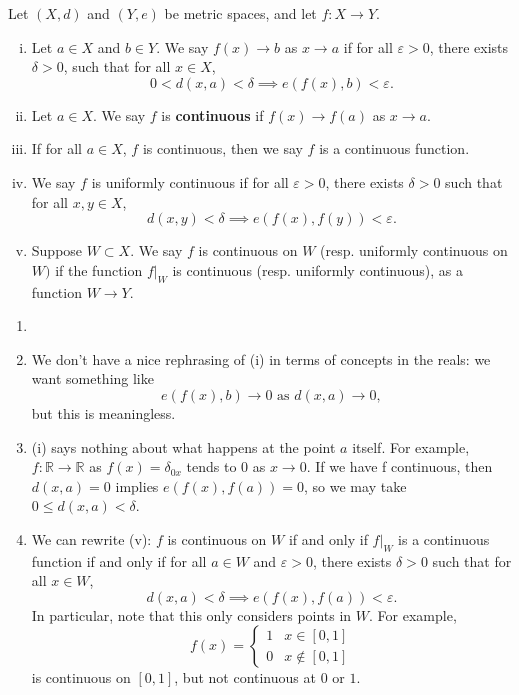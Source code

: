 \documentclass[12pt]{article}
\begin{document}
\begin{definition}
	Let $(X, d)$ and $(Y, e)$ be metric spaces, and let $f:X \to Y$.
	\begin{enumerate}[(i)]
		\item Let $a \in X$ and $b \in Y$. We say $f(x) \to b$ as $x \to a$ if for all $\varepsilon > 0$, there exists $\delta > 0$, such that for all $x \in X$,
			\[
				0 < d(x, a) < \delta \implies e(f(x), b) < \varepsilon
			.\]
		\item Let $a \in X$. We say $f$ is \textbf{continuous} if $f(x) \to f(a)$ as $x \to a$.
		\item If for all $a \in X$, $f$ is continuous, then we say $f$ is a continuous function.
		\item We say $f$ is uniformly continuous if for all $\varepsilon > 0$, there exists $\delta > 0$ such that for all $x, y \in X$,
			\[
				d(x, y) < \delta \implies e(f(x), f(y)) < \varepsilon
			.\]
		\item Suppose $W \subset X$. We say $f$ is continuous on $W$ (resp. uniformly continuous on $W)$ if the function $f|_{W}$ is continuous (resp. uniformly continuous), as a function $W \to Y$.
	\end{enumerate}
	
\end{definition}

\begin{remark}
	\begin{enumerate}[1.]
		\item[]
		\item	We don't have a nice rephrasing of (i) in terms of concepts in the reals: we want something like
			\[
				e(f(x), b) \to 0 \text{ as } d(x, a) \to 0
			,\]
			but this is meaningless.
		\item (i) says nothing about what happens at the point $a$ itself. For example, $f : \mathbb{R} \to \mathbb{R}$ as $f(x) = \delta_{0x}$ tends to $0$ as $x \to 0$. If we have f continuous, then $d(x, a) = 0$ implies $e(f(x), f(a)) = 0$, so we may take $0 \leq d(x, a) < \delta$.
		\item We can rewrite (v): $f$ is continuous on $W$ if and only if $f|_{W}$ is a continuous function if and only if for all $a \in W$ and $\varepsilon > 0$, there exists $\delta > 0$ such that for all $x \in W$,
			 \[
				 d(x, a) < \delta \implies e(f(x), f(a)) < \varepsilon
			.\]
			In particular, note that this only considers points in $W$. For example,
			\[
				f(x) =
				\begin{cases}
					1 & x \in [0, 1] \\
					0 & x \not \in [0, 1]
				\end{cases}
			\]
			is continuous on $[0, 1]$, but not continuous at $0$ or $1$.
	\end{enumerate}
\end{remark}
\end{document}
